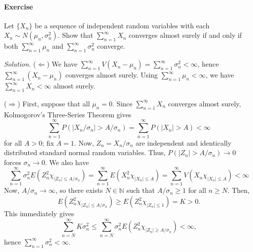 \documentclass[10pt]{article}
\newcounter{prob}
\newcommand{\problem}{\stepcounter{prob}\paragraph{Exercise \arabic{prob}}}
\newcommand{\solution}{\textit{Solution.} }
\newcommand{\N}{\mathbb{N}}
\begin{document}
    \problem Let $\{X_n\}$ be a sequence of independent random variables with each
    $X_n \sim N(\mu_n, \sigma_n^2)$. Show that $\sum_{n = 1}^\infty X_n$ converges
    almost surely if and only if both $\sum_{n = 1}^\infty \mu_n$ and $\sum_{n =
    1}^\infty \sigma_n^2$ converge.

    \solution ($\Leftarrow$) We have $\sum_{n = 1}^\infty V(X_n - \mu_n) =
    \sum_{n = 1}^\infty \sigma_n^2 < \infty$, hence $\sum_{n = 1}^\infty (X_n -
    \mu_n)$ converges almost surely. Using $\sum_{n = 1}^\infty \mu_n < \infty$, we
    have $\sum_{n = 1}^\infty X_n < \infty$ almost surely.


    ($\Rightarrow$) First, suppose that all $\mu_n = 0$. Since $\sum_{n =
    1}^\infty X_n$ converges almost surely, Kolmogorov's Three-Series Theorem gives
    \[
        \sum_{n = 1}^\infty P(|X_n/\sigma_n| > A/\sigma_n) = \sum_{n = 1}^\infty
        P(|X_n| > A) < \infty
    \] for all $A > 0$; fix $A = 1$. Now, $Z_n = X_n / \sigma_n$ are independent and
    identically distributed standard normal random variables. Thus, $P(|Z_n| >
    A/\sigma_n) \to 0$ forces $\sigma_n \to 0$. We also have \[
        \sum_{n = 1}^\infty \sigma_n^2E(Z_n^2\chi_{|Z_n| \leq A/\sigma_n}) =
        \sum_{n = 1}^\infty E(X_n^2\chi_{|X_n| \leq A}) =
        \sum_{n = 1}^\infty V(X_n\chi_{|X_n| \leq A}) < \infty
    \] Now, $A/\sigma_n \to \infty$, so there exists $N \in \N$ such that $A/\sigma_n
    \geq 1$ for all $n \geq N$. Then, \[
        E(Z_n^2\chi_{|Z_n| \leq A/\sigma_n}) \geq
        E(Z_n^2\chi_{|Z_n| \leq 1}) = K > 0.
    \] This immediately gives \[
        \sum_{n = N}^\infty K\sigma_n^2 \leq \sum_{n = N}^\infty
        \sigma_n^2 E(Z_n^2\chi_{|Z_n| \geq A/\sigma_n}) < \infty,
    \] hence $\sum_{n = 1}^\infty \sigma_n^2 < \infty$.

\end{document}
